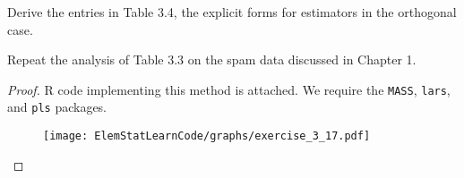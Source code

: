 \begin{exer}
    Derive the entries in Table 3.4, the explicit forms for estimators in the orthogonal case.
\end{exer}

\begin{exer}
    Repeat the analysis of Table 3.3 on the spam data discussed in Chapter 1.
\end{exer}

\begin{proof}
    R code implementing this method is attached.  We require the \texttt{MASS}, \texttt{lars}, and \texttt{pls} packages.

    \clearpage
    

    \begin{figure}
        \begin{center}
            \texttt{[image: ElemStatLearnCode/graphs/exercise\_3\_17.pdf]}
        \end{center}
    \end{figure}
\end{proof}
